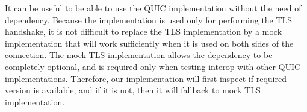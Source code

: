It can be useful to be able to use the QUIC implementation without the need of \libopenssl{}
dependency. Because the \libopenssl{} implementation is used only for performing the TLS handshake,
it is not difficult to replace the TLS implementation by a mock implementation that will work
sufficiently when it is used on both sides of the connection. The mock TLS implementation allows the
\libopenssl{} dependency to be completely optional, and is required only when testing interop with
other QUIC implementations. Therefore, our implementation will first inspect if required
\libopenssl{} version is available, and if it is not, then it will fallback to mock TLS
implementation.
